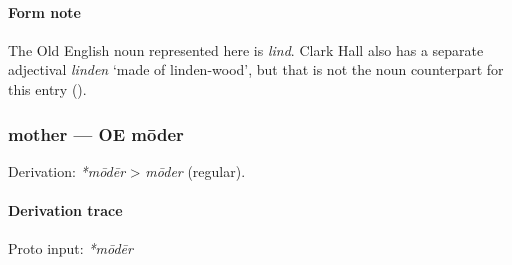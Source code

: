 \documentclass[
  british,
  a4paper,
]{article}
\begin{document}
\paragraph{Form note}\label{form-note-6}

The Old English noun represented here is \emph{lind}. Clark Hall also
has a separate adjectival \emph{linden} `made of linden-wood', but that
is not the noun counterpart for this entry
().

\subsubsection{mother --- OE mōder}\label{mother-oe-mux14dder-2}

Derivation: \emph{*mōdēr} \textgreater{} \emph{mōder} (regular).

\paragraph{Derivation trace}\label{derivation-trace-33}

Proto input: \emph{*mōdēr}

\begingroup
\setlength{\fboxsep}{6pt}
\end{document}
